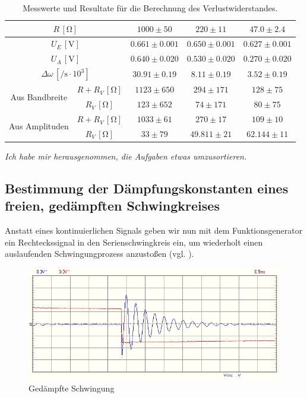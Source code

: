 \renewcommand{\arraystretch}{1.5}
\begin{table}[H]
  \centering
  \caption{Messwerte und Resultate für die Berechnung des Verlustwiderstandes.}
  \vspace*{1em}
  \begin{tabular}{|c|c|c|c|c|}
    \hline
    \multicolumn{2}{|c|}{$R\,[\si{\ohm}]$} & $1000 \pm 50$ & $220 \pm 11$ & $47.0 \pm 2.4$ \\
    \hline
    \multicolumn{2}{|c|}{$U_E\,[\si{\volt}]$} & $0.661 \pm 0.001$ & $0.650 \pm 0.001$ & $0.627 \pm 0.001$ \\
    \hline
    \multicolumn{2}{|c|}{$U_A\,[\si{\volt}]$} & $0.640 \pm 0.020$ & $0.530 \pm 0.020$ & $0.270 \pm 0.020$ \\
    \hline
    \multicolumn{2}{|c|}{$\Delta \omega\,[\si{\per\second} \cdot 10^3]$} & $30.91 \pm 0.19$ & $8.11 \pm 0.19$ & $3.52 \pm 0.19$ \\
    \hline
    \hline
    \multirow{2}{*}{Aus Bandbreite} & $R + R_V\,[\si{\ohm}]$ & $1123 \pm 650$ & $294 \pm 171$ & $128 \pm 75$ \\
    \cline{2-5}
    & $R_V\,[\si{\ohm}]$ & $123 \pm 652$ & $74 \pm 171$ & $80 \pm 75$ \\
    \hline
    \hline
    \multirow{2}{*}{Aus Amplituden} & $R + R_V\,[\si{\ohm}]$  & $1033 \pm 61$ & $270 \pm 17$ & $109 \pm 10$ \\
    \cline{2-5}
    & $R_V\,[\si{\ohm}]$ & $33 \pm 79$ & $49.811 \pm 21$ & $62.144 \pm 11$ \\
    \hline
  \end{tabular}
  \label{tab:verlustwiderstand}
\end{table}
\renewcommand{\arraystretch}{1}

\textit{Ich habe mir herausgenommen, die Aufgaben etwas umzusortieren.}

\subsection{Bestimmung der Dämpfungskonstanten eines freien, gedämpften Schwingkreises}

Anstatt eines kontinuierlichen Signals geben wir nun mit dem Funktionsgenerator ein Rechteckssignal in den Serienschwingkreis ein, um wiederholt einen auslaufenden Schwingungprozess anzustoßen (vgl. ).

\begin{figure}[H]
  \centering
  \includegraphics[width=.8\textwidth]{files/aufgabe6_schwingung_gedaempft.png}
  \caption{Gedämpfte Schwingung}
  \label{fig:aufgabe6_schwingung_gedaempft}
\end{figure}

